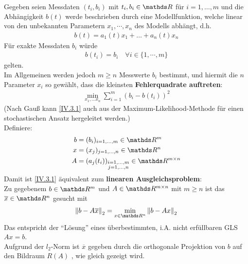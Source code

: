 
Gegeben seien Messdaten $(t_i, b_i)$ mit $t_i, b_i\in \R$ für $i=1, \dots, m$ 
und die Abhängigkeit $b(t)$ werde beschrieben durch eine Modellfunktion,
welche linear von den unbekannten Parametern $x_1, \cdots, x_n$ des Modells abhängt,
d.h.
\begin{gather*}
  b(t) = a_1(t)x_1 + \dots + a_n(t) x_n
\end{gather*}
Für exakte Messdaten $b_i$ würde 
\begin{gather*}
  b(t_i) = b_i \quad \forall i\in\{1,\cdots , m\}
\end{gather*}
gelten.\\
Im Allgemeinen werden jedoch $m\geq n $ Messwerte $b_i$ bestimmt,
und hiermit die $n$ Parameter $x_i$ so gewählt, dass die kleinsten
\textbf{Fehlerquadrate auftreten}:
\begin{gather}
  \min_{x_1, \dots x_n} \sum_{i=1}^{m} (b_i-b(t_i))^2 \label{IV.3.1}
\end{gather}
(Nach Gauß kann \eqref{IV.3.1} auch aus der Maximum-Likelihood-Methode
für einen stochastischen Ansatz hergeleitet werden.)\\

Definiere:
\begin{align*}
  b &= (b_i)_{i=1,\dots, m}\in \R^m \\
  x &= (x_j)_{j=1,\dots, n}\in \R^n \\
  A &= (a_j(t_i)) _{\substack{i=1,\dots, m \\ j= 1, \dots, n}} \in \R^{m\times n}
\end{align*}
Damit ist \eqref{IV.3.1} äquivalent zum \textbf{linearen Ausgleichsproblem}:\\
Zu gegebenem $b\in\R^m$ und $A\in\R^{m\times n}$ mit $m\geq n$
ist das $\overline{x} \in \R^n$ gesucht mit 
\begin{gather}
  \nn[b-A\overline{x}]_2 = \min_{x\in\R^n} \nn[b-Ax]_2
  \label{IV.3.2}
\end{gather}
Das entspricht der \enquote{Lösung} eines überbestimmten, i.A. nicht erfüllbaren
GLS $Ax=b$.\\
Aufgrund der $l_2$-Norm ist $\overline{x}$ gegeben durch die 
orthogonale Projektion von $b$ auf den Bildraum $R(A) $ , wie gleich gezeigt wird. \\

